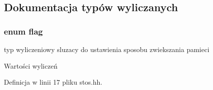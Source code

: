 \subsection{Dokumentacja typów wyliczanych}
\hypertarget{stos_8hh_a7847560c748814fd3070e9149a9578bd}{
\subsubsection[{flag}]{\setlength{\rightskip}{0pt plus 5cm}enum {\bf flag}}}\label{stos_8hh_a7847560c748814fd3070e9149a9578bd}


typ wyliczeniowy sluzacy do ustawienia sposobu zwiekszania pamieci 

\begin{Desc}
\item[Wartości wyliczeń]\par
\begin{description}
\item[{\em 
\hypertarget{stos_8hh_a7847560c748814fd3070e9149a9578bda4d2a3aa75111d5d02328fb5d495729c2}{plus1}\label{stos_8hh_a7847560c748814fd3070e9149a9578bda4d2a3aa75111d5d02328fb5d495729c2}
}]\item[{\em 
\hypertarget{stos_8hh_a7847560c748814fd3070e9149a9578bdac9b6e8d1af7ce8ae332595ccf954567c}{x2}\label{stos_8hh_a7847560c748814fd3070e9149a9578bdac9b6e8d1af7ce8ae332595ccf954567c}
}]\end{description}
\end{Desc}


Definicja w linii 17 pliku stos.\-hh.

